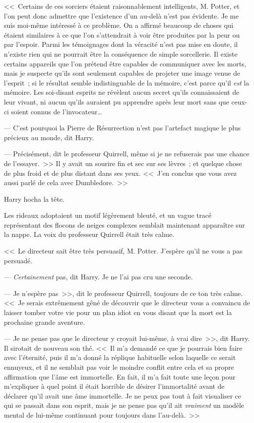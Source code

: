 <<~Certains de ces sorciers étaient raisonnablement intelligents, M. Potter, et l'on peut donc admettre que l'existence d'un au-delà n'est pas évidente. Je me suis moi-même intéressé à ce problème. On a affirmé beaucoup de choses qui étaient similaires à ce que l'on s'attendrait à voir être produites par la peur ou par l'espoir. Parmi les témoignages dont la véracité n'est pas mise en doute, il n'existe rien qui ne pourrait être la conséquence de simple sorcellerie. Il existe certains appareils que l'on prétend être capables de communiquer avec les morts, mais je suspecte qu'ils sont seulement capables de projeter une image venue de l'esprit~; si le résultat semble indistinguable de la mémoire, c'est parce qu'il \emph{est} la mémoire. Les soi-disant esprits ne révèlent aucun secret qu'ils connaissaient de leur vivant, ni aucun qu'ils auraient pu apprendre après leur mort sans que ceux-ci soient connus de l'invocateur…

--- C'est pourquoi la Pierre de Résurrection n'est pas l'artefact magique le plus précieux au monde, dit Harry.

--- Précisément, dit le professeur Quirrell, même si je ne refuserais pas une chance de l'essayer.~>> Il y avait un sourire fin et sec sur ses lèvres~; et quelque chose de plus froid et de plus distant dans ses yeux. <<~J'en conclus que vous avez aussi parlé de cela avec Dumbledore.~>>

Harry hocha la tête.

Les rideaux adoptaient un motif légèrement bleuté, et un vague tracé représentant des flocons de neiges complexes semblait maintenant apparaître sur la nappe. La voix du professeur Quirrell était très calme.

<<~Le directeur sait être très persuasif, M. Potter. J'espère qu'il ne vous a pas persuadé.

--- \emph{Certainement} pas, dit Harry. Je ne l'ai pas cru une seconde.

--- Je n'espère pas~>>, dit le professeur Quirrell, toujours de ce ton très calme. <<~Je serais extrêmement gêné de découvrir que le directeur vous a convaincu de laisser tomber votre vie pour un plan idiot en vous disant que la mort est la prochaine grande aventure.

--- Je ne pense pas que le directeur y croyait lui-même, à vrai dire~>>, dit Harry. Il sirotait de nouveau son thé. <<~Il m'a demandé ce que je pourrais bien faire avec l'éternité, puis il m'a donné la réplique habituelle selon laquelle ce serait ennuyeux, et il ne semblait pas voir le moindre conflit entre cela et sa propre affirmation que l'âme est immortelle. En fait, il m'a fait toute une leçon pour m'expliquer à quel point il était horrible de désirer l'immortalité avant de déclarer qu'il avait une âme immortelle. Je ne peux pas tout à fait visualiser ce qui se passait dans son esprit, mais je ne pense pas qu'il ait \emph{vraiment} un modèle mental de lui-même continuant pour toujours dans l'au-delà.~>>

